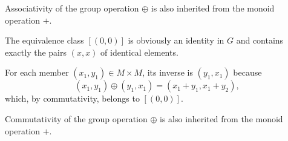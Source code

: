 \begin{defproof}
   Associativity of the group operation \( \oplus \) is also inherited from the monoid operation \( + \).

   The equivalence class \( [(0, 0)] \) is obviously an identity in \( G \) and contains exactly the pairs \( (x, x) \) of identical elements.

   For each member \( (x_1, y_1) \in M \times M \), its inverse is \( (y_1, x_1) \) because
  \begin{equation*}
    (x_1, y_1) \oplus (y_1, x_1) = (x_1 + y_1, x_1 + y_2),
  \end{equation*}
  which, by commutativity, belongs to \( [(0, 0)] \).

   Commutativity of the group operation \( \oplus \) is also inherited from the monoid operation \( + \).
\end{defproof}

